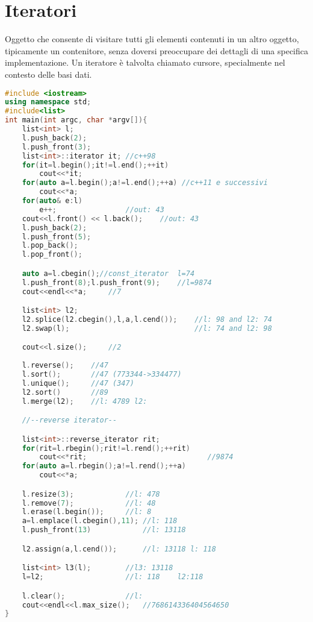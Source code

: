\section{Iteratori}
Oggetto che consente di visitare tutti gli elementi contenuti in un altro oggetto, tipicamente un contenitore, senza doversi preoccupare dei dettagli di una specifica implementazione. Un iteratore è talvolta chiamato cursore, specialmente nel contesto delle basi dati.

\begin{lstlisting}[language=c++]
#include <iostream>
using namespace std;
#include<list>
int main(int argc, char *argv[]){
    list<int> l;
    l.push_back(2);
    l.push_front(3);
    list<int>::iterator it; //c++98
    for(it=l.begin();it!=l.end();++it)
        cout<<*it;
    for(auto a=l.begin();a!=l.end();++a) //c++11 e successivi
        cout<<*a;
    for(auto& e:l)
        e++;                //out: 43
    cout<<l.front() << l.back();    //out: 43
    l.push_back(2);
    l.push_front(5);
    l.pop_back();
    l.pop_front(); 

    auto a=l.cbegin();//const_iterator  l=74
    l.push_front(8);l.push_front(9);    //l=9874
    cout<<endl<<*a;     //7

    list<int> l2;
    l2.splice(l2.cbegin(),l,a,l.cend());    //l: 98 and l2: 74
    l2.swap(l);                             //l: 74 and l2: 98

    cout<<l.size();     //2
    
    l.reverse();    //47
    l.sort();       //47 (773344->334477)
    l.unique();     //47 (347)
    l2.sort()       //89
    l.merge(l2);    //l: 4789 l2: 

    //--reverse iterator--

    list<int>::reverse_iterator rit;
    for(rit=l.rbegin();rit!=l.rend();++rit)
        cout<<*rit;                            //9874
    for(auto a=l.rbegin();a!=l.rend();++a)
        cout<<*a;

    l.resize(3);            //l: 478
    l.remove(7);            //l: 48
    l.erase(l.begin());     //l: 8
    a=l.emplace(l.cbegin(),11); //l: 118
    l.push_front(13)            //l: 13118

    l2.assign(a,l.cend());      //l: 13118 l: 118

    list<int> l3(l);        //l3: 13118
    l=l2;                   //l: 118    l2:118

    l.clear();              //l: 
    cout<<endl<<l.max_size();   //768614336404564650
}
    
\end{lstlisting}


